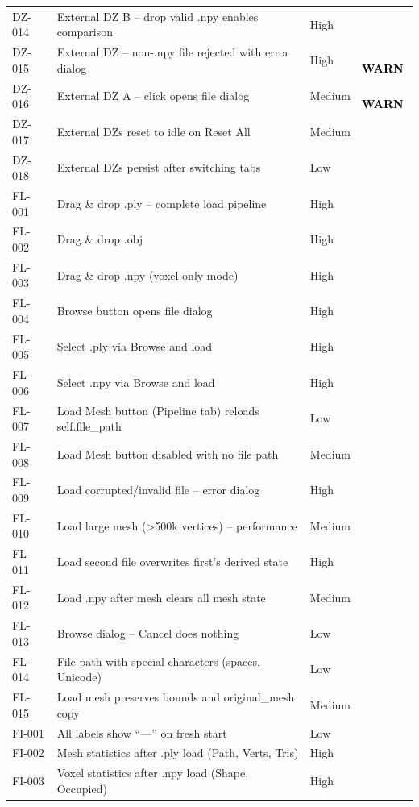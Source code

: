 \documentclass[12pt,a4paper]{article}
\newcommand{\statuspass}{\colorbox{statusgreen}{\textcolor{white}{\textbf{\,PASS\,}}}}
\newcommand{\statuswarn}{\colorbox{statusyellow}{\textcolor{black}{\textbf{\,WARN\,}}}}
\begin{document}
{\begin{longtable}{p{1.7cm}p{7.7cm}p{1.3cm}p{2cm}}
DZ-014 & External DZ B -- drop valid .npy enables comparison & High & \statuspass \\
DZ-015 & External DZ -- non-.npy file rejected with error dialog & High & \statuswarn \\
DZ-016 & External DZ A -- click opens file dialog & Medium & \statuswarn \\
DZ-017 & External DZs reset to idle on Reset All & Medium & \statuspass \\
DZ-018 & External DZs persist after switching tabs & Low & \statuspass \\
FL-001 & Drag \& drop .ply -- complete load pipeline & High & \statuspass \\
FL-002 & Drag \& drop .obj & High & \statuspass \\
FL-003 & Drag \& drop .npy (voxel-only mode) & High & \statuspass \\
FL-004 & Browse button opens file dialog & High & \statuspass \\
FL-005 & Select .ply via Browse and load & High & \statuspass \\
FL-006 & Select .npy via Browse and load & High & \statuspass \\
FL-007 & Load Mesh button (Pipeline tab) reloads self.file\_path & Low & \statuspass \\
FL-008 & Load Mesh button disabled with no file path & Medium & \statuspass \\
FL-009 & Load corrupted/invalid file -- error dialog & High & \statuspass \\
FL-010 & Load large mesh (>500k vertices) -- performance & Medium & \statuspass \\
FL-011 & Load second file overwrites first's derived state & High & \statuspass \\
FL-012 & Load .npy after mesh clears all mesh state & Medium & \statuspass \\
FL-013 & Browse dialog -- Cancel does nothing & Low & \statuspass \\
FL-014 & File path with special characters (spaces, Unicode) & Low & \statuspass \\
FL-015 & Load mesh preserves bounds and original\_mesh copy & Medium & \statuspass \\
FI-001 & All labels show ``---'' on fresh start & Low & \statuspass \\
FI-002 & Mesh statistics after .ply load (Path, Verts, Tris) & High & \statuspass \\
FI-003 & Voxel statistics after .npy load (Shape, Occupied) & High & \statuspass \\

\end{longtable}}
\end{document}

